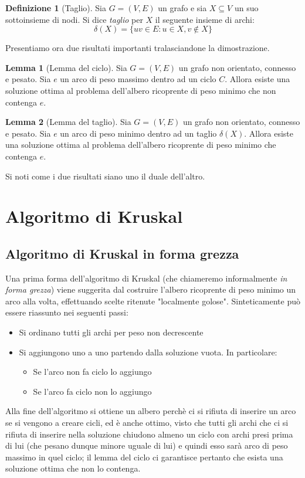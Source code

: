 \documentclass[12pt,a4paper,twoside]{article}
\theoremstyle{definition}
\newtheorem{definition}{Definizione}[section]
\theoremstyle{definition}
\newtheorem{lemma}{Lemma}[section]
\theoremstyle{theorem}
\begin{document}
	\begin{definition}[Taglio]
		Sia $G=(V,E)$ un grafo e sia $X\subseteq V$ un suo sottoinsieme di nodi. Si dice \emph{taglio} per $X$ il seguente insieme di archi:
		\begin{equation}
		\delta(X) = \{uv \in E : u \in X, v \notin X\}
		\end{equation}
	\end{definition}
	Presentiamo ora due risultati importanti tralasciandone la dimostrazione.
	\begin{lemma}[Lemma del ciclo]
		Sia $G=(V,E)$ un grafo non orientato, connesso e pesato. Sia $e$ un arco di peso massimo dentro ad un ciclo $C$. Allora esiste una soluzione ottima al problema dell'albero ricoprente di peso minimo che non contenga $e$.
	\end{lemma}
	\begin{lemma}[Lemma del taglio]
		Sia $G=(V,E)$ un grafo non orientato, connesso e pesato. Sia $e$ un arco di peso minimo dentro ad un taglio $\delta(X)$. Allora esiste una soluzione ottima al problema dell'albero ricoprente di peso minimo che contenga $e$.
	\end{lemma}
	Si noti come i due risultati siano uno il duale dell'altro.
		
	
	\section{Algoritmo di Kruskal}
	\subsection{Algoritmo di Kruskal in forma grezza}
	Una prima forma dell'algoritmo di Kruskal (che chiameremo informalmente \emph{in forma grezza}) viene suggerita dal costruire l'albero ricoprente di peso minimo un arco alla volta, effettuando scelte ritenute "localmente golose". Sinteticamente può essere riassunto nei seguenti passi:
	\begin{itemize}
		\item Si ordinano tutti gli archi per peso non decrescente
		\item Si aggiungono uno a uno partendo dalla soluzione vuota. In particolare:
		\begin{itemize}
			\item Se l'arco non fa ciclo lo aggiungo
			\item Se l'arco fa ciclo non lo aggiungo
		\end{itemize}
	\end{itemize}
	Alla fine dell'algoritmo si ottiene un albero perchè ci si rifiuta di inserire un arco se si vengono a creare cicli, ed è anche ottimo, visto che tutti gli archi che ci si rifiuta di inserire nella soluzione chiudono almeno un ciclo con archi presi prima di lui (che pesano dunque minore uguale di lui) e quindi esso sarà arco di peso massimo in quel ciclo; il lemma del ciclo ci garantisce pertanto che esista una soluzione ottima che non lo contenga.
	
\end{document}
